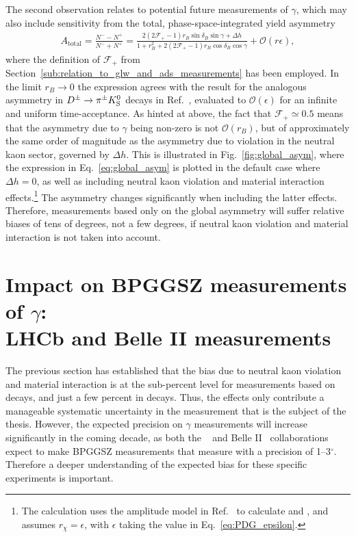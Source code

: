 The second observation relates to potential future measurements of $\gamma$, which may also include sensitivity from the total, phase-space-integrated yield asymmetry
\begin{align}\label{eq:global_asym}
    A_\text{total}=\frac{N^--N^+}{N^-+N^+} = 
    \frac{ 2(2\mathcal F_+ -1)r_B \sin \delta_B \sin \gamma +\Delta h}
    {1 + r_B^2+ 2(2\mathcal F_+ -1) r_B \cos \delta_B \cos \gamma} + \mathcal O(r\epsilon),
\end{align}
where the definition of $\mathcal F_+$ from Section~\ref{sub:relation_to_glw_and_ads_measurements} has been employed. In the limit $r_B\to 0$ the expression agrees with the result for the analogous asymmetry in ${{D}^\pm}\rightarrow{\ensuremath{{\pi}^\pm}}{\ensuremath{{K}^0_{\mathrm{S}}}}$ decays in Ref.~\cite{grossmanCPViolationKSv2012}, evaluated to $\mathcal O(\epsilon)$ for an infinite and uniform time-acceptance. As hinted at above, the fact that $\mathcal F_+\simeq 0.5$ means that the asymmetry due to $\gamma$ being non-zero is not $\mathcal O(r_B)$, but of approximately the same order of magnitude as the asymmetry due to \CP violation in the neutral kaon sector, governed by $\Delta h$. This is illustrated in Fig.~\ref{fig:global_asym}, where the expression in Eq.~\eqref{eq:global_asym} is plotted in the default case where $\Delta h=0$, as well as including neutral kaon \CP violation and material interaction effects.\footnote{The calculation uses the amplitude model in Ref.~\cite{Belle2018} to calculate \Ki and \ci,  and assumes $r_\chi=\epsilon$, with $\epsilon$ taking the value in Eq.~\eqref{eq:PDG_epsilon}.} The asymmetry changes significantly when including the latter effects. Therefore, measurements based only on the global asymmetry will suffer relative biases of tens of degrees, not a few degrees, if neutral kaon \CP violation and material interaction is not taken into account. 




\section{\texorpdfstring{Impact on BPGGSZ measurements of $\gamma$:\\LHCb and Belle II measurements}{Impact on BPGGSZ measurements of gamma: LHCb and Belle II measurements}} %
\label{sec:impact_on_ggsz_measurements}

The previous section has established that the bias due to neutral kaon \CP violation and material interaction is at the sub-percent level for measurements based on \BtoDK decays, and just a few percent in \BtoDpi decays. Thus, the effects only contribute a manageable systematic uncertainty in the measurement that is the subject of the thesis. However, the expected precision on $\gamma$ measurements will increase significantly in the coming decade, as both the \lhcb~\cite{lhcbcollaborationPhysicsCaseLHCb2019} and Belle II~\cite{kouBelleIIPhysics2019} collaborations expect to make BPGGSZ measurements that measure \g with a precision of 1--3$^\circ$. Therefore a deeper understanding of the expected bias for these specific experiments is important.

